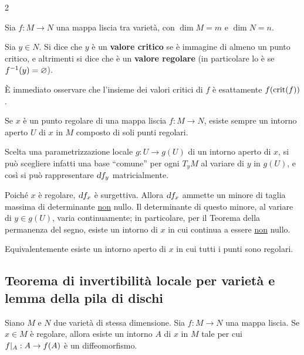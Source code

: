 \begin{multicols*}{2}
    \begin{definition}
        Sia $f : M \to N$ una mappa liscia tra varietà, con
        $\dim M = m$ e $\dim N = n$. \smallskip

        Sia $y \in N$. Si dice che $y$ è un \textbf{valore critico}
        se è immagine di almeno un punto critico, e altrimenti si dice che
        è un \textbf{valore regolare} (in particolare lo è se
        $f^{-1}(y) = \varnothing$).
    \end{definition}

    \begin{remark}
        È immediato osservare che l'insieme dei valori critici di
        $f$ è esattamente $f(\operatorname{crit}(f))$.
    \end{remark}

    \begin{remark} \label{rmk:punti_regolari_formano_aperto}
        Se $x$ è un punto regolare di una mappa liscia
        $f : M \to N$, esiste sempre un intorno aperto $U$
        di $x$ in $M$ composto di soli punti regolari. \smallskip

        Scelta una parametrizzazione locale $g : U \to g(U)$ di un intorno aperto di $x$,
        si può scegliere infatti una base ``comune'' per ogni $T_y M$ al
        variare di $y$ in $g(U)$, e così si può rappresentare
        $\dif f_y$ matricialmente. \smallskip

        Poiché $x$ è regolare, $\dif f_x$ è surgettiva. Allora
        $\dif f_x$ ammette un minore di taglia massima di
        determinante \underline{non} nullo. Il determinante di questo minore,
        al variare di $y \in g(U)$, varia continuamente; in particolare, per
        il Teorema della permanenza del segno, esiste un intorno di $x$
        in cui continua a essere \underline{non} nullo. \smallskip

        Equivalentemente esiste un intorno aperto di $x$ in cui tutti i punti
        sono regolari.
    \end{remark}

    \subsection{Teorema di invertibilità locale per varietà e lemma della pila di dischi}

    \begin{theorem} \label{thm:invertibilità_locale_varietà}
        Siano $M$ e $N$ due varietà di stessa dimensione. Sia
        $f : M \to N$ una mappa liscia. Se $x \in M$ è regolare,
        allora esiste un intorno $A$ di $x$ in $M$ tale per cui
        $f\arrowvert_{A} : A \to f(A)$ è un diffeomorfismo.
    \end{theorem}


\end{multicols*}
